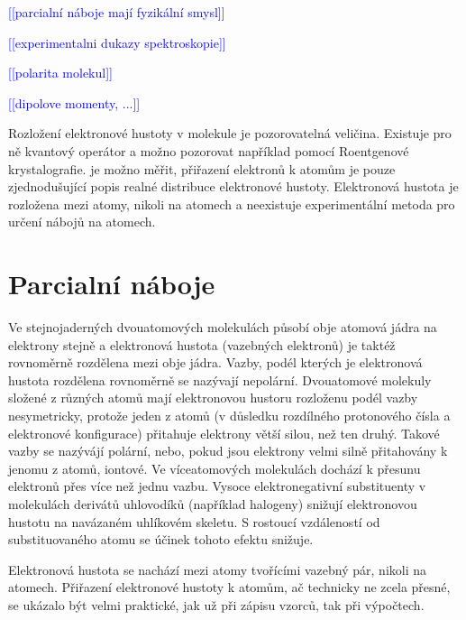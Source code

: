 \documentclass[
  color, %
  table, %
  lof,   %
  lot,   %
]{fithesis3}
\newcommand\todo[1]{\textcolor{blue}{[[#1]]}}
\begin{document}



\todo{parcialní náboje mají fyzikální smysl}

\todo{experimentalni dukazy spektroskopie}

\todo{polarita molekul}

\todo{dipolove momenty, ...}




Rozložení elektronové hustoty v molekule je pozorovatelná veličina. Existuje pro ně kvantový operátor a možno pozorovat například pomocí Roentgenové krystalografie. je možno měřit, přiřazení elektronů k atomům je pouze zjednodušující popis realné distribuce elektronové hustoty. Elektronová hustota je rozložena mezi atomy, nikoli na atomech a neexistuje experimentální metoda pro určení nábojů na atomech.

\chapter{Parcialní náboje}

Ve stejnojaderných dvouatomových molekulách působí obje atomová jádra na elektrony stejně a elektronová hustota (vazebných elektronů) je taktéž rovnoměrně rozdělena mezi obje jádra. Vazby, podél kterých je elektronová hustota rozdělena rovnoměrně se nazývají nepolární. Dvouatomové molekuly složené z různých atomů mají elektronovou hustoru rozloženu podél vazby nesymetricky, protože jeden z atomů (v důsledku rozdílného protonového čísla a elektronové konfigurace) přitahuje elektrony větší silou, než ten druhý. Takové vazby se nazývájí polární, nebo, pokud jsou elektrony velmi silně přitahovány k jenomu z atomů, iontové. Ve víceatomových molekulách dochází k přesunu elektronů přes více než jednu vazbu. Vysoce elektronegativní substituenty v molekulách derivátů uhlovodíků (například halogeny) snižují elektronovou hustotu na navázaném uhlíkovém skeletu. S rostoucí vzdáleností od substituovaného atomu se účinek tohoto efektu snižuje. \citep[s.~120]{benešová2002odmaturuj}

Elektronová hustota se nachází mezi atomy tvořícími vazebný pár, nikoli na atomech. Přiřazení elektronové hustoty k atomům, ač technicky ne zcela přesné, se ukázalo být velmi praktické, jak už při zápisu vzorců, tak při výpočtech.
\end{document}
